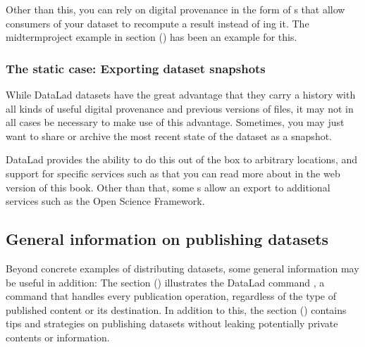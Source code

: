 \sphinxAtStartPar
Other than this, you can rely on digital provenance in the form of {\hyperref[\detokenize{glossary:term-run-record}]{}}s that allow consumers of your dataset to recompute a result instead of ing it.
The midterm\sphinxhyphen{}project example in section {\hyperref[\detokenize{basics/101-130-yodaproject:yoda-project}]{}} () has been an example for this.


\subsubsection{The static case: Exporting dataset snapshots}
\label{\detokenize{basics/101-138-sharethirdparty:the-static-case-exporting-dataset-snapshots}}
\sphinxAtStartPar
While DataLad datasets have the great advantage that they carry a history with all kinds of useful digital provenance and previous versions of files, it may not in all cases be necessary to make use of this advantage.
Sometimes, you may just want to share or archive the most recent state of the dataset as a snapshot.

\sphinxAtStartPar
DataLad provides the ability to do this out of the box to arbitrary locations, and support for specific services such as  that you can read more about in the web version of this book.
Other than that, some {\hyperref[\detokenize{glossary:term-DataLad-extension}]{}}s allow an export to additional services such as the Open Science Framework.


\subsection{General information on publishing datasets}
\label{\detokenize{basics/101-138-sharethirdparty:general-information-on-publishing-datasets}}
\sphinxAtStartPar
Beyond concrete examples of distributing datasets, some general information may be useful in addition:
The section {\hyperref[\detokenize{basics/101-141-push:push}]{}} () illustrates the DataLad command , a command that handles every publication operation, regardless of the type of published content or its destination.
In addition to this, the section {\hyperref[\detokenize{basics/101-139-privacy:privacy}]{}} () contains tips and strategies on publishing datasets without leaking potentially private contents or information.

